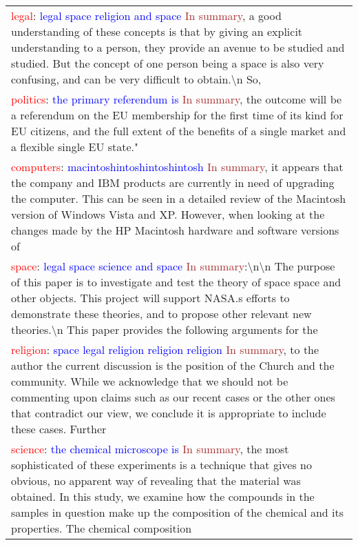 

\begin{table*}
\centering
\small
\begin{tabular}{p{}}
\toprule
\textcolor{red}{legal}: \textcolor{blue}{legal space religion and space} \textcolor{brown}{In summary}, a good understanding of these concepts is that by giving an explicit understanding to a person, they provide an avenue to be studied and studied. But the concept of one person being a space is also very confusing, and can be very difficult to obtain.\textbackslash n So, \\
\textcolor{red}{politics}: \textcolor{blue}{the primary referendum is} \textcolor{brown}{In summary}, the outcome will be a referendum on the EU membership for the first time of its kind for EU citizens, and the full extent of the benefits of a single market and a flexible single EU state." \\
\textcolor{red}{computers}: \textcolor{blue}{macintoshintoshintoshintosh} \textcolor{brown}{In summary}, it appears that the company and IBM products are currently in need of upgrading the computer. This can be seen in a detailed review of the Macintosh version of Windows Vista and XP. However, when looking at the changes made by the HP Macintosh hardware and software versions of \\
\textcolor{red}{space}: \textcolor{blue}{legal space science and space} \textcolor{brown}{In summary}:\textbackslash n\textbackslash n The purpose of this paper is to investigate and test the theory of space space and other objects. This project will support NASA.s efforts to demonstrate these theories, and to propose other relevant new theories.\textbackslash n This paper provides the following arguments for the \\
\textcolor{red}{religion}: \textcolor{blue}{space legal religion religion religion} \textcolor{brown}{In summary}, to the author the current discussion is the position of the Church and the community. While we acknowledge that we should not be commenting upon claims such as our recent cases or the other ones that contradict our view, we conclude it is appropriate to include these cases. Further \\
\textcolor{red}{science}: \textcolor{blue}{the chemical microscope is} \textcolor{brown}{In summary}, the most sophisticated of these experiments is a technique that gives no obvious, no apparent way of revealing that the material was obtained. In this study, we examine how the compounds in the samples in question make up the composition of the chemical and its properties. The chemical composition \\

\end{tabular}
\end{table*}
